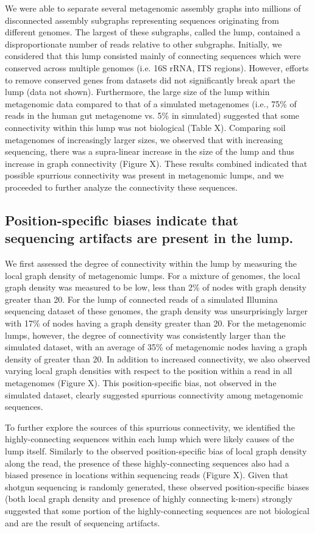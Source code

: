\documentclass[11pt]{article} %
\begin{document}
We were able to separate several metagenomic assembly graphs into millions of disconnected assembly subgraphs representing sequences originating from different genomes.  The largest of these subgraphs, called the lump, contained a disproportionate number of reads relative to other subgraphs.  Initially, we considered that this lump consisted mainly of connecting sequences which were conserved across multiple genomes (i.e. 16S rRNA, ITS regions).  However, efforts to remove conserved genes from datasets did not significantly break apart the lump (data not shown).  Furthermore, the large size of the lump within metagenomic data compared to that of a simulated metagenomes (i.e., 75\% of reads in the human gut metagenome vs. 5\% in simulated) suggested that some connectivity within this lump was not biological (Table X).  Comparing soil metagenomes of increasingly larger sizes, we observed that with increasing sequencing, there was a supra-linear increase in the size of the lump and thus increase in graph connectivity (Figure X). These results combined indicated that possible spurrious connectivity was present in metagenomic lumps, and we proceeded to further analyze the connectivity these sequences.

\subsection{Position-specific biases indicate that sequencing artifacts are present in the lump.}
We first assessed the degree of connectivity within the lump by measuring the local graph density of metagenomic lumps.  For a mixture of genomes, the local graph density was measured to be low, less than 2\% of nodes with graph density greater than 20.  For the lump of connected reads of a simulated Illumina sequencing dataset of these genomes, the graph density was unsurprisingly larger with 17\% of nodes having a graph density greater than 20.   For the metagenomic lumps, however, the degree of connectivity was consistently larger than the simulated dataset, with an average of 35\% of metagenomic nodes having a graph density of greater than 20.   In addition to increased connectivity, we also observed varying local graph densities with respect to the position within a read in all metagenomes (Figure X).  This position-specific bias, not observed in the simulated dataset, clearly suggested spurrious connectivity among metagenomic sequences.  

To further explore the sources of this spurrious connectivity, we identified the highly-connecting sequences within each lump which were likely causes of the lump itself.  Similarly to the observed position-specific bias of local graph density along the read, the presence of these highly-connecting sequences also had a biased presence in locations within sequencing reads (Figure X).  Given that shotgun sequencing is randomly generated, these observed position-specific biases (both local graph density and presence of highly connecting k-mers) strongly suggested that some portion of the highly-connecting sequences are not biological and are the result of sequencing artifacts.  
\end{document}
